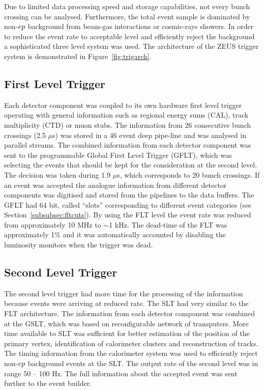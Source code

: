 Due to limited data processing speed and storage capabilities, not every bunch crossing can be analysed. Furthermore, the total event sample is dominated by non-$\mbox{$e p$}$ background from beam-gas interactions or cosmic-rays showers. In order to reduce the event rate to acceptable level and efficiently reject the background a sophisticated three level system was used. The architecture of the ZEUS trigger system is demonstrated in Figure~\ref{fig:trigarch}. 

\subsection{First Level Trigger}
\label{subsec:flt} Each detector component was coupled to its own hardware first level trigger operating with general information such as regional energy sums (CAL), track multiplicity (CTD) or muon stubs. The information from 26 consecutive bunch crossings (2.5 $\mu$s) was stored in a 46 event deep pipe-line and was analysed in parallel streams. The combined information from each detector component was sent to the programmable Global First Level Trigger (GFLT), which was selecting the events that should be kept for the consideration at the second level. The decision was taken during 1.9 $\mu$s, which corresponds to 20 bunch crossings. If an event was accepted the analogue information from different detector components was digitised and stored from the pipelines to the data buffers. The GFLT had 64 bit, called ``slots'' corresponding to different event categories (see Section~\ref{subsubsec:fltcuts}). By using the FLT level the event rate was reduced from approximately 10 MHz to $\sim$1 kHz. The dead-time of the FLT was approximately 1\% and it was automatically accounted by disabling the luminosity monitors when the trigger was dead.

\subsection{Second Level Trigger}
\label{subsec:slt}
The second level trigger had more time for the processing of the information because events were arriving at reduced rate. The SLT had very similar to the FLT architecture. The information from each detector component was combined at the GSLT, which was based on reconfigurable network of transputers. More time available to SLT was sufficient for better estimation of the position of the primary vertex, identification of  calorimeter clusters and reconstruction of tracks. The timing information from the calorimeter system was used to efficiently reject non-$\mbox{$e p$}$ background events at the SLT. The output rate of the second level was in range 50 -- 100 Hz. The full information about the accepted event was sent further to the event builder.

